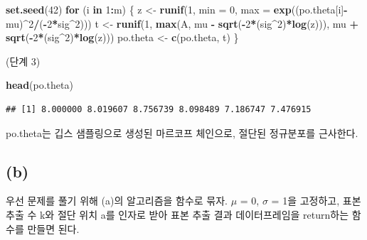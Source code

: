 \documentclass[
]{article}
\newenvironment{Shaded}{\begin{snugshade}}{\end{snugshade}}
\newcommand{\AttributeTok}[1]{\textcolor[rgb]{0.13,0.29,0.53}{#1}}
\newcommand{\ControlFlowTok}[1]{\textcolor[rgb]{0.13,0.29,0.53}{\textbf{#1}}}
\newcommand{\DecValTok}[1]{\textcolor[rgb]{0.00,0.00,0.81}{#1}}
\newcommand{\FunctionTok}[1]{\textcolor[rgb]{0.13,0.29,0.53}{\textbf{#1}}}
\newcommand{\NormalTok}[1]{#1}
\newcommand{\OtherTok}[1]{\textcolor[rgb]{0.56,0.35,0.01}{#1}}
\newcommand{\SpecialCharTok}[1]{\textcolor[rgb]{0.81,0.36,0.00}{\textbf{#1}}}
\begin{document}
\begin{Shaded}
\begin{Highlighting}[]
\FunctionTok{set.seed}\NormalTok{(}\DecValTok{42}\NormalTok{)}
\ControlFlowTok{for}\NormalTok{ (i }\ControlFlowTok{in} \DecValTok{1}\SpecialCharTok{:}\NormalTok{m) \{}
\NormalTok{  z }\OtherTok{\textless{}{-}} \FunctionTok{runif}\NormalTok{(}\DecValTok{1}\NormalTok{, }\AttributeTok{min =} \DecValTok{0}\NormalTok{, }\AttributeTok{max =} \FunctionTok{exp}\NormalTok{((po.theta[i]}\SpecialCharTok{{-}}\NormalTok{mu)}\SpecialCharTok{\^{}}\DecValTok{2}\SpecialCharTok{/}\NormalTok{(}\SpecialCharTok{{-}}\DecValTok{2}\SpecialCharTok{*}\NormalTok{sig}\SpecialCharTok{\^{}}\DecValTok{2}\NormalTok{)))}
\NormalTok{  t }\OtherTok{\textless{}{-}} \FunctionTok{runif}\NormalTok{(}\DecValTok{1}\NormalTok{, }\FunctionTok{max}\NormalTok{(A, mu }\SpecialCharTok{{-}} \FunctionTok{sqrt}\NormalTok{(}\SpecialCharTok{{-}}\DecValTok{2}\SpecialCharTok{*}\NormalTok{(sig}\SpecialCharTok{\^{}}\DecValTok{2}\NormalTok{)}\SpecialCharTok{*}\FunctionTok{log}\NormalTok{(z))), mu }\SpecialCharTok{+} \FunctionTok{sqrt}\NormalTok{(}\SpecialCharTok{{-}}\DecValTok{2}\SpecialCharTok{*}\NormalTok{(sig}\SpecialCharTok{\^{}}\DecValTok{2}\NormalTok{)}\SpecialCharTok{*}\FunctionTok{log}\NormalTok{(z)))}
\NormalTok{  po.theta }\OtherTok{\textless{}{-}} \FunctionTok{c}\NormalTok{(po.theta, t)}
\NormalTok{\}}
\end{Highlighting}
\end{Shaded}

(단계 3)

\begin{Shaded}
\begin{Highlighting}[]
\FunctionTok{head}\NormalTok{(po.theta)}
\end{Highlighting}
\end{Shaded}

\begin{verbatim}
## [1] 8.000000 8.019607 8.756739 8.098489 7.186747 7.476915
\end{verbatim}

po.theta는 깁스 샘플링으로 생성된 마르코프 체인으로, 절단된 정규분포를
근사한다.

\subsection{(b)}\label{b-2}

우선 문제를 풀기 위해 (a)의 알고리즘을 함수로 묶자. \(\mu\) = 0,
\(\sigma\) = 1을 고정하고, 표본 추출 수 k와 절단 위치 a를 인자로 받아
표본 추출 결과 데이터프레임을 return하는 함수를 만들면 된다.
\end{document}
